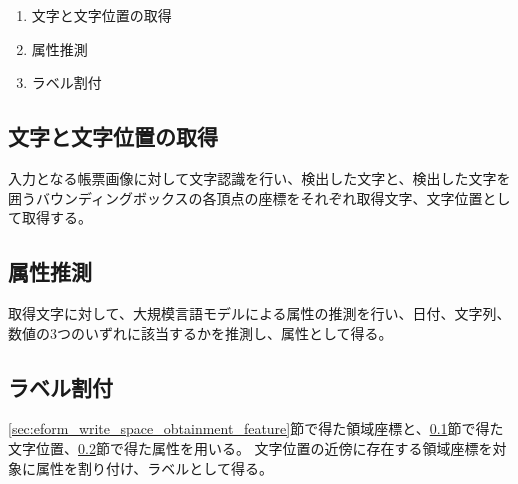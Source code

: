 \begin{enumerate}
  \item 文字と文字位置の取得
  \item 属性推測
  \item ラベル割付
\end{enumerate}

\subsection{文字と文字位置の取得}\label{subsec:char_and_bbox_obtainment}
入力となる帳票画像に対して文字認識を行い、検出した文字と、検出した文字を囲うバウンディングボックスの各頂点の座標をそれぞれ取得文字、文字位置として取得する。

\subsection{属性推測}\label{subsec:att_prediction}
取得文字に対して、大規模言語モデルによる属性の推測を行い、日付、文字列、数値の3つのいずれに該当するかを推測し、属性として得る。

\subsection{ラベル割付}\label{subsec:label_link}
\ref{sec:eform_write_space_obtainment_feature}節で得た領域座標と、\ref{subsec:char_and_bbox_obtainment}節で得た文字位置、\ref{subsec:att_prediction}節で得た属性を用いる。
文字位置の近傍に存在する領域座標を対象に属性を割り付け、ラベルとして得る。
